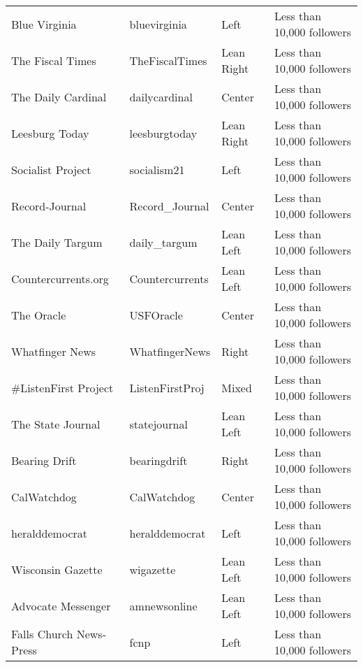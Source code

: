 \begin{tabular}{llll}
               Blue Virginia &     bluevirginia &          Left &                Less than 10,000 followers \\
            The Fiscal Times &   TheFiscalTimes &    Lean Right &                Less than 10,000 followers \\
          The Daily Cardinal &    dailycardinal &        Center &                Less than 10,000 followers \\
              Leesburg Today &    leesburgtoday &    Lean Right &                Less than 10,000 followers \\
           Socialist Project &      socialism21 &          Left &                Less than 10,000 followers \\
              Record-Journal &   Record\_Journal &        Center &                Less than 10,000 followers \\
            The Daily Targum &     daily\_targum &     Lean Left &                Less than 10,000 followers \\
         Countercurrents.org &  Countercurrents &     Lean Left &                Less than 10,000 followers \\
                  The Oracle &        USFOracle &        Center &                Less than 10,000 followers \\
             Whatfinger News &   WhatfingerNews &         Right &                Less than 10,000 followers \\
        \#ListenFirst Project &  ListenFirstProj &         Mixed &                Less than 10,000 followers \\
           The State Journal &     statejournal &     Lean Left &                Less than 10,000 followers \\
               Bearing Drift &     bearingdrift &         Right &                Less than 10,000 followers \\
                 CalWatchdog &      CalWatchdog &        Center &                Less than 10,000 followers \\
              heralddemocrat &   heralddemocrat &          Left &                Less than 10,000 followers \\
           Wisconsin Gazette &        wigazette &     Lean Left &                Less than 10,000 followers \\
          Advocate Messenger &     amnewsonline &     Lean Left &                Less than 10,000 followers \\
     Falls Church News-Press &             fcnp &          Left &                Less than 10,000 followers \\

\end{tabular}
